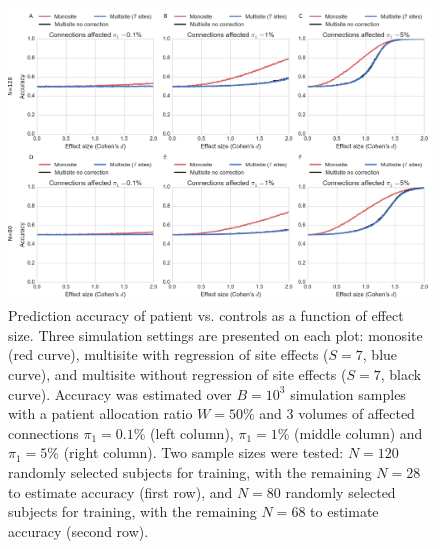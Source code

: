 \documentclass[authoryear]{elsarticle}
\begin{document}
\begin{figure}[htbp]
\centering
\captionsetup[subfloat]{labelformat=empty}
\includegraphics[width=\textwidth]{../figures/prediction_effectsize.png}
\caption[]{
Prediction accuracy of patient vs. controls as a function of effect size. Three simulation settings are presented on each plot: monosite (red curve), multisite with regression of site effects ($S=7$, blue curve), and multisite without regression of site effects ($S=7$, black curve). Accuracy was estimated over $B=10^3$ simulation samples with a patient allocation ratio $W=50\%$ and 3 volumes of affected connections $\pi_1=0.1\%$ (left column), $\pi_1=1\%$ (middle column) and $\pi_1=5\%$ (right column). Two sample sizes were tested: $N=120$ randomly selected subjects for training, with the remaining $N=28$ to estimate accuracy (first row), and $N=80$ randomly selected subjects for training, with the remaining $N=68$ to estimate accuracy (second row).
}
\label{fig_prediction_sampeffect}
\end{figure}
\end{document}

